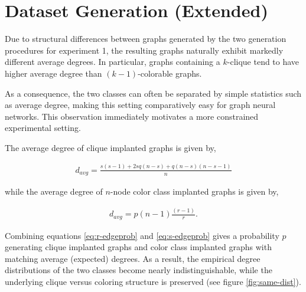 \section{Dataset Generation (Extended)}\label{app:datGeneration}

Due to structural differences between graphs generated by the two generation procedures for experiment 1, the resulting graphs naturally exhibit markedly different average degrees.
In particular, graphs containing a $k$-clique tend to have higher average degree than $(k\!-\!1)$-colorable graphs. %

As a consequence, the two classes can often be separated by simple statistics such as average degree, making this setting comparatively easy for graph neural networks. %
This observation immediately motivates a more constrained experimental setting.

The average degree of clique implanted graphs is given by,

\begin{equation}
\label{eq:s-edgeprob}
    \begin{split}
        d_{avg} = \frac{s(s-1) + 2sq(n-s) + q (n -s) (n-s-1) }{n}
    \end{split}
\end{equation}

while the average degree of $n$-node color class implanted graphs is given by, 

\begin{equation}
\label{eq:r-edgeprob}
    \begin{split}
        d_{avg} = p(n-1)\frac{(r-1)}{r}.
    \end{split}
\end{equation}

Combining equations \ref{eq:r-edgeprob} and \ref{eq:s-edgeprob} gives a probability $p$ generating clique implanted graphs and color class implanted graphs with matching average (expected) degrees. 
As a result, the empirical degree distributions of the two classes become nearly indistinguishable, while the underlying clique versus coloring structure is preserved (see figure \ref{fig:same-dist}). 

